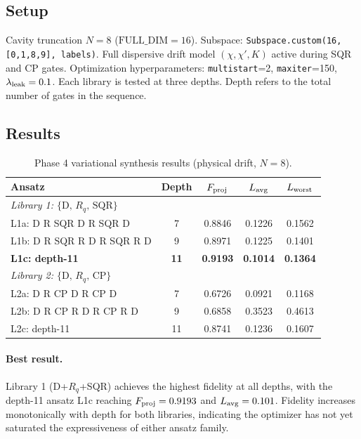 \documentclass[11pt,a4paper]{article}
\newcommand{\Fproj}{F_{\rm proj}}
\newcommand{\Lavg}{L_{\rm avg}}
\newcommand{\SQR}{\mathrm{SQR}}
\newcommand{\CP}{\mathrm{CP}}
\newcommand{\disp}{\mathrm{D}}
\begin{document}
\subsection{Setup}

Cavity truncation $N=8$ ($\mathrm{FULL\_DIM}=16$).
Subspace: \texttt{Subspace.custom(16, [0,1,8,9], labels)}.
Full dispersive drift model $(\chi,\chi',K)$ active during SQR and CP gates.
Optimization hyperparameters: \texttt{multistart}=2, \texttt{maxiter}=150,
$\lambda_{\rm leak}=0.1$.
Each library is tested at three depths.  Depth refers to the total number of
gates in the sequence.

\subsection{Results}

\begin{table}[H]
  \centering
  \caption{Phase 4 variational synthesis results (physical drift, $N=8$).}
  \label{tab:phase4}
  \begin{tabular}{lcccc}
    \toprule
    Ansatz & Depth & $\Fproj$ & $\Lavg$ & $L_{\rm worst}$ \\
    \midrule
    \multicolumn{5}{l}{\textit{Library 1: $\{\disp,\,R_q,\,\SQR\}$}} \\
    L1a: D R SQR D R SQR D     & 7  & 0.8846 & 0.1226 & 0.1562 \\
    L1b: D R SQR R D R SQR R D & 9  & 0.8971 & 0.1225 & 0.1401 \\
    \textbf{L1c: depth-11}     & \textbf{11} & \textbf{0.9193} & \textbf{0.1014} & \textbf{0.1364} \\
    \midrule
    \multicolumn{5}{l}{\textit{Library 2: $\{\disp,\,R_q,\,\CP\}$}} \\
    L2a: D R CP D R CP D       & 7  & 0.6726 & 0.0921 & 0.1168 \\
    L2b: D R CP R D R CP R D   & 9  & 0.6858 & 0.3523 & 0.4613 \\
    L2c: depth-11              & 11 & 0.8741 & 0.1236 & 0.1607 \\
    \bottomrule
  \end{tabular}
\end{table}

\paragraph{Best result.}
Library 1 (D+$R_q$+SQR) achieves the highest fidelity at all depths,
with the depth-11 ansatz L1c reaching $\Fproj=0.9193$ and $\Lavg=0.101$.
Fidelity increases monotonically with depth for both libraries, indicating
the optimizer has not yet saturated the expressiveness of either ansatz family.
\end{document}
